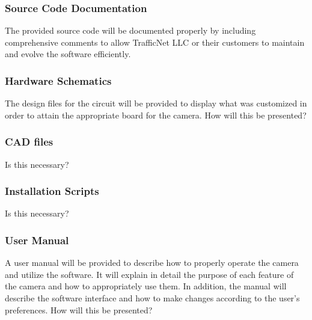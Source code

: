 \subsubsection{Source Code Documentation}
The provided source code will be documented properly by including comprehensive comments to allow TrafficNet LLC or their customers to maintain and evolve the software efficiently. 

\subsubsection{Hardware Schematics}
The design files for the circuit will be provided to display what was customized in order to attain the appropriate board for the camera. How will this be presented?

\subsubsection{CAD files}
Is this necessary?

\subsubsection{Installation Scripts}
Is this necessary?

\subsubsection{User Manual}
A user manual will be provided to describe how to properly operate the camera and utilize the software. It will explain in detail the purpose of each feature of the camera and how to appropriately use them. In addition, the manual will describe the software interface and how to make changes according to the user’s preferences. How will this be presented? 



